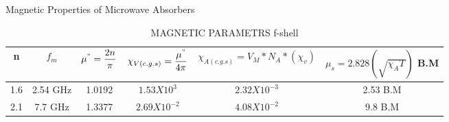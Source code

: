 \documentclass[journal]{IEEEtran}
\begin{document}
Magnetic Properties of Microwave Absorbers
\newline
\begin{longtable}{|c|c|c|c|c|c|}
\caption{MAGNETIC PARAMETRS f-shell}
		
	
	\\
	\hline
		n & $f_m$ & $\mu^{"} = \dfrac{2 n}{\pi}$ & $\chi_{V(c.g.s)}= \dfrac{\mu^{"}}{4 \pi}$ & \small{$\chi_{A(c.g.s)}= V_M*N_A*(\chi_v)$} &\small{ $\mu_s =  2.828 (\sqrt{{\chi_A T}}) $ B.M} \\
		\hline
		1.6 & 2.54 GHz &  1.0192 & $1.53X10^{3}$ & $2.32 X 10^{-3} $ & 2.53 B.M \\
		\hline
		2.1 & 7.7 GHz  & 1.3377 & $2.69 X 10^{-2}$ & $4.08 X 10^{-2}$ & 9.8 B.M \\
		\hline
\end{longtable}
\end{document}
